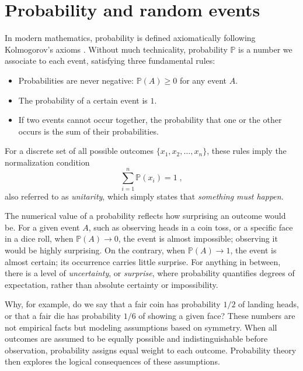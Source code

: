 \section{Probability and random events}

In modern mathematics, probability is defined axiomatically following Kolmogorov's axioms \cite{kolmogorov_1933_grundbegriffe}. Without much technicality, probability $\mathbb{P}$ is a number we associate to each event, satisfying three fundamental rules:
\begin{itemize}
    \item Probabilities are never negative: $\mathbb{P}(A) \ge 0$ for any event $A$.
    \item The probability of a certain event is $1$.
    \item If two events cannot occur together, the probability that one or the other occurs is the sum of their probabilities.
\end{itemize}
For a discrete set of all possible outcomes $\{x_1, x_2, \dots, x_n\}$, these rules imply the normalization condition
\begin{equation}
    \sum_{i = 1}^n \mathbb{P}(x_i) = 1 \; , \nonumber
\end{equation}
also referred to as \textit{unitarity}, which simply states that \textit{something must happen}.

\medskip

The numerical value of a probability reflects how surprising an outcome would be. For a given event ${A}$, such as observing heads in a coin toss, or a specific face in a dice roll, when $\mathbb{P}(A) \to 0$, the event is almost impossible; observing it would be highly surprising. On the contrary, when $\mathbb{P}(A) \to 1$, the event is almost certain; its occurrence carries little surprise. For anything in between, there is a level of \textit{uncertainty}, or \textit{surprise}, where probability quantifies degrees of expectation, rather than absolute certainty or impossibility.

\medskip

Why, for example, do we say that a fair coin has probability $1/2$ of landing heads, or that a fair die has probability $1/6$ of showing a given face? These numbers are not empirical facts but modeling assumptions based on symmetry. When all outcomes are assumed to be equally possible and indistinguishable before observation, probability assigns equal weight to each outcome. Probability theory then explores the logical consequences of these assumptions.

